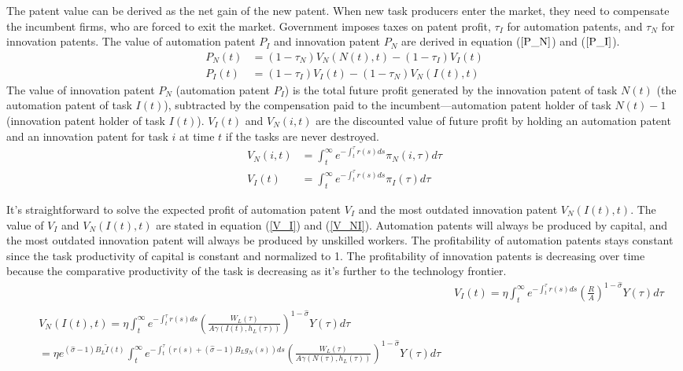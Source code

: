 \documentclass[12pt]{article}
\begin{document}
The patent value can be derived as the net gain of the new patent. When new task producers enter the market, they need to compensate the incumbent firms, who are forced to exit the market. Government imposes taxes on patent profit, $\tau_I$ for automation patents, and $\tau_N$ for innovation patents. The value of automation patent $P_I$ and innovation patent $P_N$ are derived in equation ($\ref{P_N}$) and ($\ref{P_I}$).
\begin{align}
\label{P_N}
P_N(t) &= (1-\tau_N)V_N(N(t),t)-(1-\tau_I)V_I(t) \\
\label{P_I}
P_I(t) &= (1-\tau_I)V_I(t)-(1-\tau_N)V_N(I(t),t) 
\end{align}
The value of innovation patent $P_N$ (automation patent $P_I$) is the total future profit generated by the innovation patent of task $N(t)$ (the automation patent of task $I(t)$), subtracted by the compensation paid to the incumbent—automation patent holder of task $N(t)-1$ (innovation patent holder of task $I(t)$). $V_I(t)$ and $V_N(i,t)$ are the discounted value of future profit by holding an automation patent and an innovation patent for task $i$ at time $t$ if the tasks are never destroyed.
\begin{align}
\label{V_N}
V_N(i,t) &= \int_{t}^{\infty} e^{-\int_{t}^{\tau}r(s)ds}\pi_N(i,\tau)d\tau \\
\label{V_I}
V_I(t)&= \int_{t}^{\infty} e^{-\int_{t}^{\tau}r(s)ds}\pi_I(\tau)d\tau 
\end{align} 

It's straightforward to solve the expected profit of automation patent $V_I$ and the most outdated innovation patent $V_N(I(t),t)$. The value of $V_I$ and $V_N(I(t),t)$ are stated in equation (\ref{V_I}) and (\ref{V_NI}). Automation patents will always be produced by capital, and the most outdated innovation patent will always be produced by unskilled workers. The profitability of automation patents stays constant since the task productivity of capital is constant and normalized to 1. The profitability of innovation patents is decreasing over time because the comparative productivity of the task is decreasing as it's further to the technology frontier. 
 \begin{align}
 \label{V_I}
&V_I(t)= \eta\int_t^{\infty} e^{-\int_{t}^{\tau}r(s)ds}(\frac{R}{A})^{1-\hat{\sigma}}Y(\tau)d\tau \\
\label{V_NI}
\begin{split}
&V_N(I(t),t) =\eta \int_t^{\infty} e^{-\int_{t}^{\tau}r(s)ds}(\frac{W_L(\tau)}{A\gamma(I(t),h_L(\tau))})^{1-\hat{\sigma}}Y(\tau)d\tau \\
&= \eta e^{(\hat{\sigma}-1)B_L\tilde{I}(t)}\int_t^{\infty} e^{-\int_{t}^{\tau}(r(s)+(\hat{\sigma}-1)B_Lg_N(s))ds}(\frac{W_L(\tau)}{A\gamma(N(\tau),h_L(\tau))})^{1-\hat{\sigma}}Y(\tau)d\tau
\end{split}				
 \end{align}
\end{document}
